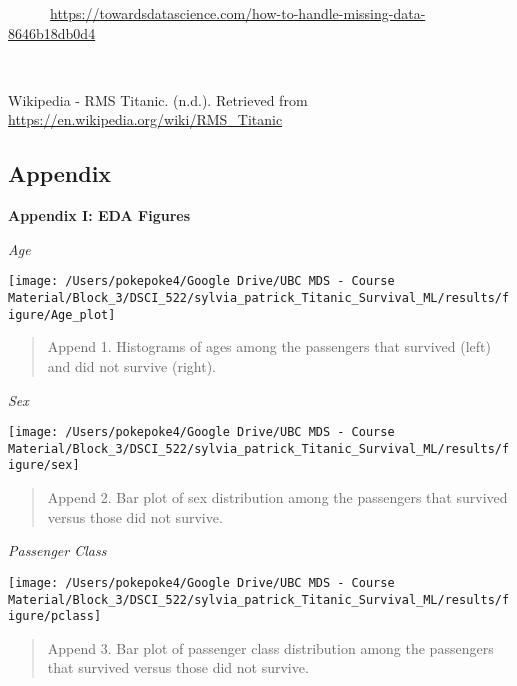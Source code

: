 \documentclass[]{article}
\begin{document}
~~~~~~\url{https://towardsdatascience.com/how-to-handle-missing-data-8646b18db0d4}

~

Wikipedia - RMS Titanic. (n.d.). Retrieved from
\url{https://en.wikipedia.org/wiki/RMS_Titanic}

\newpage

\subsection{Appendix}\label{appendix}

\textbf{Appendix I: EDA Figures}

\emph{Age}

\begin{center}\texttt{[image: /Users/pokepoke4/Google Drive/UBC MDS - Course Material/Block\_3/DSCI\_522/sylvia\_patrick\_Titanic\_Survival\_ML/results/figure/Age\_plot]} \end{center}

\begin{quote}
Append 1. Histograms of ages among the passengers that survived (left)
and did not survive (right).
\end{quote}

\newpage

\emph{Sex}

\begin{center}\texttt{[image: /Users/pokepoke4/Google Drive/UBC MDS - Course Material/Block\_3/DSCI\_522/sylvia\_patrick\_Titanic\_Survival\_ML/results/figure/sex]} \end{center}

\begin{quote}
Append 2. Bar plot of sex distribution among the passengers that
survived versus those did not survive.
\end{quote}

\newpage

\emph{Passenger Class}

\begin{center}\texttt{[image: /Users/pokepoke4/Google Drive/UBC MDS - Course Material/Block\_3/DSCI\_522/sylvia\_patrick\_Titanic\_Survival\_ML/results/figure/pclass]} \end{center}

\begin{quote}
Append 3. Bar plot of passenger class distribution among the passengers
that survived versus those did not survive.
\end{quote}
\end{document}
